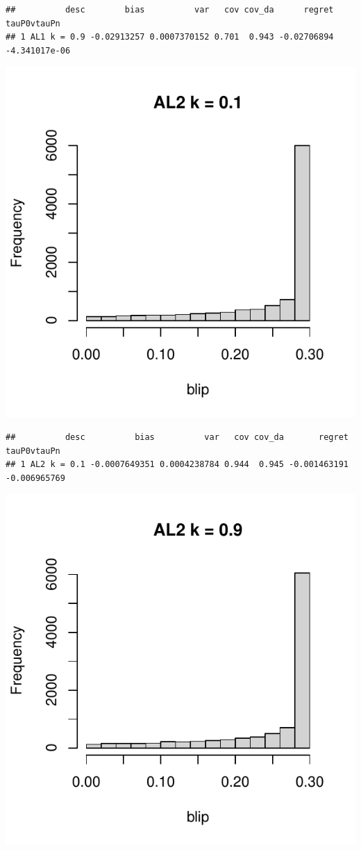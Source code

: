 \documentclass[11pt]{article}\usepackage[]{graphicx}\usepackage[table]{xcolor}
\makeatletter
\def\maxwidth{ %
  \ifdim\Gin@nat@width>\linewidth
    \linewidth
  \else
    \Gin@nat@width
  \fi
}
\newenvironment{kframe}{%
 \def\at@end@of@kframe{}%
 \ifinner\ifhmode%
  \def\at@end@of@kframe{\end{minipage}}%
  \begin{minipage}{\columnwidth}%
 \fi\fi%
 \def\FrameCommand##1{\hskip\@totalleftmargin \hskip-\fboxsep
 \colorbox{shadecolor}{##1}\hskip-\fboxsep
     \hskip-\linewidth \hskip-\@totalleftmargin \hskip\columnwidth}%
 \MakeFramed {\advance\hsize-\width
   \@totalleftmargin\z@ \linewidth\hsize
   \@setminipage}}%
 {\par\unskip\endMakeFramed%
 \at@end@of@kframe}
\newenvironment{knitrout}{}{} %
\makeatother
\begin{document}
\begin{knitrout}
\begin{kframe}\begin{verbatim}
##          desc        bias          var   cov cov_da      regret   tauP0vtauPn
## 1 AL1 k = 0.9 -0.02913257 0.0007370152 0.701  0.943 -0.02706894 -4.341017e-06
\end{verbatim}
\end{kframe}
\includegraphics[width=\maxwidth]{figure/unnamed-chunk-4-15} 
\begin{kframe}\begin{verbatim}
##          desc          bias          var   cov cov_da       regret  tauP0vtauPn
## 1 AL2 k = 0.1 -0.0007649351 0.0004238784 0.944  0.945 -0.001463191 -0.006965769
\end{verbatim}
\end{kframe}
\includegraphics[width=\maxwidth]{figure/unnamed-chunk-4-16} 

\end{knitrout}
\end{document}
